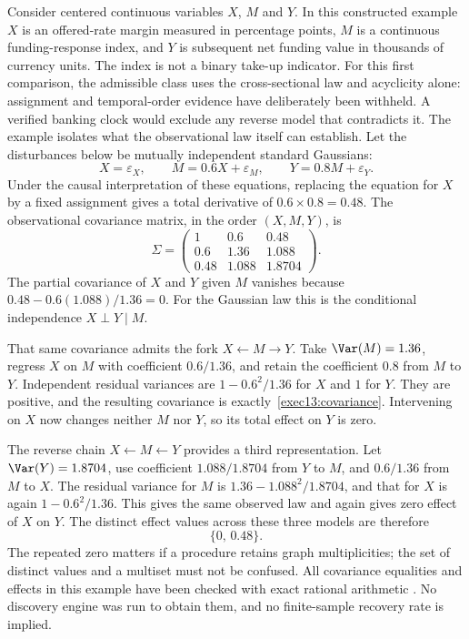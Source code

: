 Consider centered continuous variables $X$, $M$ and $Y$. In this constructed
example $X$ is an offered-rate margin measured in percentage points, $M$ is
a continuous funding-response index, and $Y$ is subsequent net funding value
in thousands of currency units. The index is not a binary take-up indicator.
For this first comparison, the admissible class uses the cross-sectional law
and acyclicity alone: assignment and temporal-order evidence have deliberately
been withheld. A verified banking clock would exclude any reverse model that
contradicts it. The example isolates what the observational law itself can
establish. Let the disturbances below be mutually independent standard Gaussians:
\begin{equation}
 X=\varepsilon_X,\qquad M=0.6X+\varepsilon_M,
 \qquad Y=0.8M+\varepsilon_Y.
 \label{exec13:forward}
\end{equation}
Under the causal interpretation of these equations, replacing the equation
for $X$ by a fixed assignment gives a total derivative of $0.6\times0.8=0.48$.
The observational covariance matrix, in the order $(X,M,Y)$, is
\begin{equation}
 \Sigma=\begin{pmatrix}
 1&0.6&0.48\\
 0.6&1.36&1.088\\
 0.48&1.088&1.8704
 \end{pmatrix}.
 \label{exec13:covariance}
\end{equation}
The partial covariance of $X$ and $Y$ given $M$ vanishes because
$0.48-0.6(1.088)/1.36=0$. For the Gaussian law this is the conditional
independence $X\perp Y\mid M$.

That same covariance admits the fork $X\leftarrow M\rightarrow Y$.
Take $\Var(M)=1.36$, regress $X$ on $M$ with coefficient $0.6/1.36$,
and retain the coefficient $0.8$ from $M$ to $Y$. Independent residual
variances are $1-0.6^2/1.36$ for $X$ and $1$ for $Y$. They are positive,
and the resulting covariance is exactly~\eqref{exec13:covariance}.
Intervening on $X$ now changes neither $M$ nor $Y$, so its total effect on
$Y$ is zero.

The reverse chain $X\leftarrow M\leftarrow Y$ provides a third representation.
Let $\Var(Y)=1.8704$, use coefficient $1.088/1.8704$ from $Y$ to $M$,
and $0.6/1.36$ from $M$ to $X$. The residual variance for $M$ is
$1.36-1.088^2/1.8704$, and that for $X$ is again $1-0.6^2/1.36$.
This gives the same observed law and again gives zero effect of $X$ on $Y$.
The distinct effect values across these three models are therefore
\begin{equation}
 \{0,\,0.48\}.
 \label{exec13:effect-set}
\end{equation}
The repeated zero matters if a procedure retains graph multiplicities; the
set of distinct values and a multiset must not be confused. All covariance
equalities and effects in this example have been checked with exact rational
arithmetic \citep{exec13_examples}. No discovery engine was run to obtain
them, and no finite-sample recovery rate is implied.

